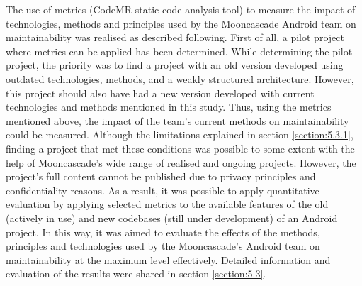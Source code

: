 The use of metrics (CodeMR static code analysis tool) to measure the impact of technologies, methods and principles used by the Mooncascade Android team on maintainability was realised as described following. First of all, a pilot project where metrics can be applied has been determined. While determining the pilot project, the priority was to find a project with an old version developed using outdated technologies, methods, and a weakly structured architecture. However, this project should also have had a new version developed with current technologies and methods mentioned in this study. Thus, using the metrics mentioned above, the impact of the team's current methods on maintainability could be measured. Although the limitations explained in section \ref{section:5.3.1}, finding a project that met these conditions was possible to some extent with the help of Mooncascade's wide range of realised and ongoing projects. However, the project's full content cannot be published due to privacy principles and confidentiality reasons. As a result, it was possible to apply quantitative evaluation by applying selected metrics to the available features of the old (actively in use) and new codebases (still under development) of an Android project. In this way, it was aimed to evaluate the effects of the methods, principles and technologies used by the Mooncascade's Android team on maintainability at the maximum level effectively. Detailed information and evaluation of the results were shared in section \ref{section:5.3}.